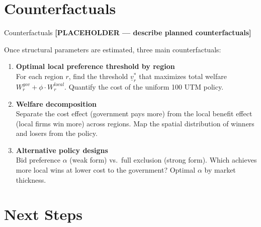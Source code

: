 \documentclass[9pt,aspectratio=169]{beamer}
\begin{document}
\section{Counterfactuals}

\begin{frame}{Counterfactuals}
\textbf{[PLACEHOLDER --- describe planned counterfactuals]}

\medskip
Once structural parameters are estimated, three main counterfactuals:

\begin{enumerate}
  \item \textbf{Optimal local preference threshold by region}\\
        For each region $r$, find the threshold $\underline{v}_r^*$ that maximizes
        total welfare $W_r^{gov} + \phi \cdot W_r^{local}$.
        Quantify the cost of the uniform 100 UTM policy.

  \vspace{0.4em}
  \item \textbf{Welfare decomposition}\\
        Separate the cost effect (government pays more) from the
        local benefit effect (local firms win more) across regions.
        Map the spatial distribution of winners and losers from the policy.

  \vspace{0.4em}
  \item \textbf{Alternative policy designs}\\
        Bid preference $\alpha$ (weak form) vs.\ full exclusion (strong form).
        Which achieves more local wins at lower cost to the government?
        Optimal $\alpha$ by market thickness.
\end{enumerate}
\end{frame}


\section{Next Steps}
\end{document}
